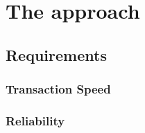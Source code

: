 

\section{The approach}
\subsection{Requirements}
\subsubsection{Transaction Speed}
\subsubsection{Reliability}